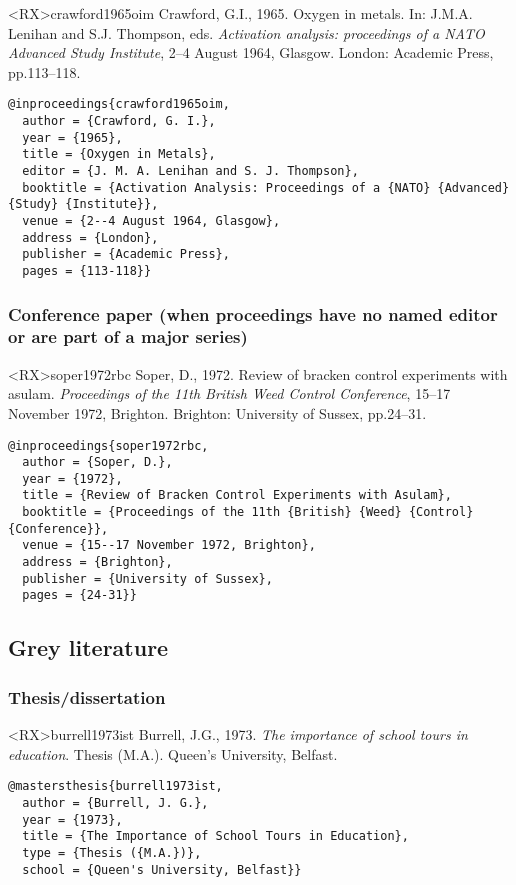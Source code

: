\documentclass[10pt,a4paper]{article}
\begin{document}
\begin{bibexbox}<RX>{crawford1965oim}
  Crawford, G.I., 1965. Oxygen in metals. In: J.M.A. Lenihan and S.J. Thompson, eds. \emph{Activation analysis: proceedings of a NATO Advanced Study Institute}, 2--4 August 1964, Glasgow. London: Academic Press, pp.113--118.
  \tcblower
\begin{Verbatim}
@inproceedings{crawford1965oim,
  author = {Crawford, G. I.},
  year = {1965},
  title = {Oxygen in Metals},
  editor = {J. M. A. Lenihan and S. J. Thompson},
  booktitle = {Activation Analysis: Proceedings of a {NATO} {Advanced} {Study} {Institute}},
  venue = {2--4 August 1964, Glasgow},
  address = {London},
  publisher = {Academic Press},
  pages = {113-118}}
\end{Verbatim}
\end{bibexbox}

\subsubsection*{Conference paper (when proceedings have no named editor or are part of a major series)}

\begin{bibexbox}<RX>{soper1972rbc}
  Soper, D., 1972. Review of bracken control experiments with asulam. \emph{Proceedings of the 11th British Weed Control Conference}, 15--17 November 1972, Brighton. Brighton: University of Sussex, pp.24--31.
  \tcblower
\begin{Verbatim}
@inproceedings{soper1972rbc,
  author = {Soper, D.},
  year = {1972},
  title = {Review of Bracken Control Experiments with Asulam},
  booktitle = {Proceedings of the 11th {British} {Weed} {Control} {Conference}},
  venue = {15--17 November 1972, Brighton},
  address = {Brighton},
  publisher = {University of Sussex},
  pages = {24-31}}
\end{Verbatim}
\end{bibexbox}

\subsection{Grey literature}

\subsubsection*{Thesis/dissertation}

\begin{bibexbox}<RX>{burrell1973ist}
  Burrell, J.G., 1973. \emph{The importance of school tours in education}. Thesis (M.A.). Queen's University, Belfast.
  \tcblower
\begin{Verbatim}
@mastersthesis{burrell1973ist,
  author = {Burrell, J. G.},
  year = {1973},
  title = {The Importance of School Tours in Education},
  type = {Thesis ({M.A.})},
  school = {Queen's University, Belfast}}
\end{Verbatim}
\end{bibexbox}
\end{document}
